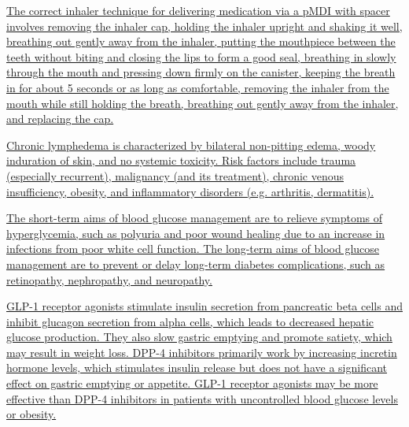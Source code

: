\documentclass[10pt, a4paper]{article}
\begin{document}
\begin{multicols}{2}
\begin{enumerate}
\parbox{\linewidth}{\item \href{https://www.notion.so/Clinical-Pharmacology-Case-Dyspnoea-24c8992694b148e6b305280805e36d1a}{ The correct inhaler technique for delivering medication via a pMDI with spacer involves removing the inhaler cap, holding the inhaler upright and shaking it well, breathing out gently away from the inhaler, putting the mouthpiece between the teeth without biting and closing the lips to form a good seal, breathing in slowly through the mouth and pressing down firmly on the canister, keeping the breath in for about 5 seconds or as long as comfortable, removing the inhaler from the mouth while still holding the breath, breathing out gently away from the inhaler, and replacing the cap.}} 

 \vspace{6pt} 

\parbox{\linewidth}{\item \href{https://www.notion.so/Skin-Soft-Tissue-Bone-and-Joint-Infections-495d0e2013354cdabb0c692542250246}{ Chronic lymphedema is characterized by bilateral non-pitting edema, woody induration of skin, and no systemic toxicity. Risk factors include trauma (especially recurrent), malignancy (and its treatment), chronic venous insufficiency, obesity, and inflammatory disorders (e.g. arthritis, dermatitis).}} 

 \vspace{6pt} 

\parbox{\linewidth}{\item \href{https://www.notion.so/Diabetes-Management-Injectable-Agents-e411c62a865246eb8948e72d27a4c6bc}{ The short-term aims of blood glucose management are to relieve symptoms of hyperglycemia, such as polyuria and poor wound healing due to an increase in infections from poor white cell function. The long-term aims of blood glucose management are to prevent or delay long-term diabetes complications, such as retinopathy, nephropathy, and neuropathy.}} 

 \vspace{6pt} 

\parbox{\linewidth}{\item \href{https://www.notion.so/Overview-of-Diabetes-Management-Oral-Agents-81f832bc2167485ea86646655d911d2a}{ GLP-1 receptor agonists stimulate insulin secretion from pancreatic beta cells and inhibit glucagon secretion from alpha cells, which leads to decreased hepatic glucose production. They also slow gastric emptying and promote satiety, which may result in weight loss. DPP-4 inhibitors primarily work by increasing incretin hormone levels, which stimulates insulin release but does not have a significant effect on gastric emptying or appetite. GLP-1 receptor agonists may be more effective than DPP-4 inhibitors in patients with uncontrolled blood glucose levels or obesity.}} 


\end{enumerate}
\end{multicols}
\end{document}
